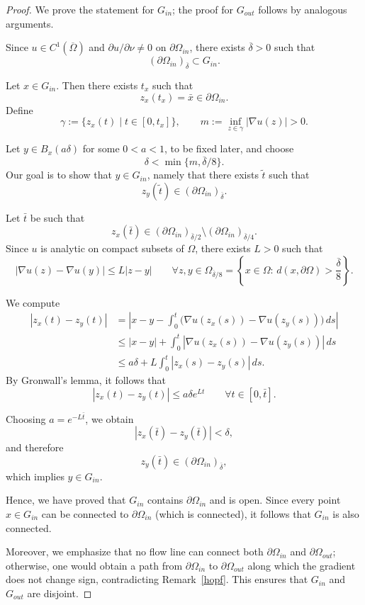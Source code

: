 \documentclass[10pt,a4paper]{amsart}
\begin{document}
\begin{proof}
We prove the statement for $G_{in}$; the proof for $G_{out}$ follows by analogous arguments.

Since $u \in C^{1}(\overline \Omega)$ and $\partial u / \partial \nu \neq 0$ on $\partial \Omega_{in}$, there exists $\overline{\delta} > 0$ such that
\[
(\partial \Omega_{in})_{\overline{\delta}} \subset G_{in}.
\]

Let $x \in G_{in}$. Then there exists $t_x$ such that
\[
z_x(t_x) = \bar{x} \in \partial \Omega_{in}.
\]
Define
\[
\gamma := \{ z_x(t) \mid t \in [0,t_x] \},
\qquad
m := \inf_{z \in \gamma} |\nabla u(z)| > 0.
\]

Let $y \in B_x(a\delta)$ for some $0 < a < 1$, to be fixed later, and choose
\[
\delta < \min \{ m, \overline{\delta}/8 \}.
\]
Our goal is to show that $y \in G_{in}$, namely that there exists $\tilde{t}$ such that
\[
z_y(\tilde {t}) \in (\partial \Omega_{in})_{\overline{\delta}}.
\]

Let $\bar{t}$ be such that
\[
z_x(\bar{t}) \in (\partial \Omega_{in})_{\overline{\delta}/2}
\setminus (\partial \Omega_{in})_{\overline{\delta}/4}.
\]
Since $u$ is analytic on compact subsets of $\Omega$, there exists $L > 0$ such that
\[
|\nabla u(z) - \nabla u(y)| \le L |z-y|
\qquad \forall z,y \in \Omega_{\overline{\delta}/8}= \left\{x \in \Omega : \, d (x, \partial \Omega )> \frac{\overline \delta
}{8}\right\}.
\]

We compute
\begin{align*}
|z_x(t) - z_y(t)|
&= \left| x - y - \int_0^t \bigl( \nabla u(z_x(s)) - \nabla u(z_y(s)) \bigr)\, ds \right| \\
&\le |x-y| + \int_0^t |\nabla u(z_x(s)) - \nabla u(z_y(s))|\, ds \\
&\le a\delta + L \int_0^t |z_x(s) - z_y(s)|\, ds.
\end{align*}
By Gronwall's lemma, it follows that
\[
|z_x(t) - z_y(t)| \le a \delta e^{Lt}
\qquad \forall t \in [0,\bar{t}].
\]

Choosing $a = e^{-L\bar{t}}$, we obtain
\[
|z_x(\bar{t}) - z_y(\bar{t})| < \delta,
\]
and therefore
\[
z_y(\bar{t}) \in (\partial \Omega_{in})_{\overline{\delta}},
\]
which implies $y \in G_{in}$.

Hence, we have proved that $G_{in}$ contains $\partial \Omega_{in}$ and is open. Since every point $x \in G_{in}$ can be connected to $\partial \Omega_{in}$ (which is connected), it follows that $G_{in}$ is also connected. 

Moreover, we emphasize that no flow line can connect both $\partial \Omega_{in}$ and $\partial \Omega_{out}$; otherwise, one would obtain a path from $\partial \Omega_{in}$ to $\partial \Omega_{out}$ along which the gradient does not change sign, contradicting Remark~\ref{hopf}. This ensures that $G_{in}$ and $G_{out}$ are disjoint.
\end{proof}
\end{document}
